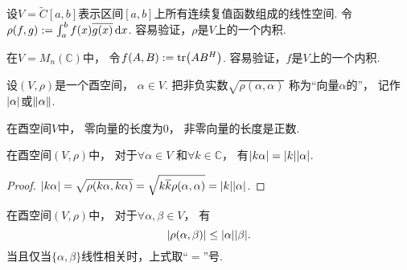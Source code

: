 \begin{example}
设\(V = \tilde{C}[a,b]\)表示区间\([a,b]\)上所有连续复值函数组成的线性空间.
令\(\rho(f,g) := \int_a^b f(x) \overline{g(x)} \dd{x}\).
容易验证，\(\rho\)是\(V\)上的一个内积.
\end{example}

\begin{example}
在\(V = M_n(\mathbb{C})\)中，
令\(f(A,B) := \tr(A B^H)\).
容易验证，\(f\)是\(V\)上的一个内积.
\end{example}

\begin{definition}
设\((V,\rho)\)是一个酉空间，
\(\alpha \in V\).
把非负实数\(\sqrt{\rho(\alpha,\alpha)}\)
称为“向量\(\alpha\)的”，
记作\(\abs{\alpha}\)或\(\norm{\alpha}\).
\end{definition}

\begin{property}
在酉空间\(V\)中，
零向量的长度为\(0\)，
非零向量的长度是正数.
\end{property}

\begin{property}
在酉空间\((V,\rho)\)中，
对于\(\forall \alpha \in V\)
和\(\forall k \in \mathbb{C}\)，
有\(\abs{k\alpha} = \abs{k} \abs{\alpha}\).
\begin{proof}
\(\abs{k\alpha}
= \sqrt{\rho(k\alpha,k\alpha)}
= \sqrt{k \overline{k} \rho(\alpha,\alpha)}
= \abs{k} \abs{\alpha}\).
\end{proof}
\end{property}

\begin{theorem}
在酉空间\((V,\rho)\)中，
对于\(\forall \alpha,\beta \in V\)，
有\begin{equation}
	\abs{\rho(\alpha,\beta)} \leq \abs{\alpha} \abs{\beta}.
\end{equation}
当且仅当\(\{\alpha,\beta\}\)线性相关时，上式取“\(=\)”号.
\end{theorem}

